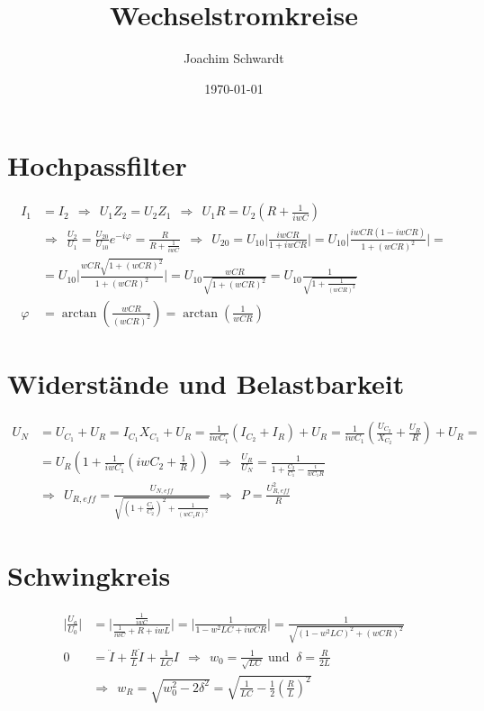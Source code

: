 \documentclass[a4paper,12pt]{article}
\begin{document}
\title{Wechselstromkreise}
\author{Joachim Schwardt}
\date{\today}
\maketitle

\section{Hochpassfilter}
\begin{align*}
I_1&=I_2\ \ \Rightarrow\ \ U_1Z_2=U_2Z_1\ \ \Rightarrow\ \ U_1R=U_2(R+\frac{1}{iwC})\\ 
&\Rightarrow\ \ \frac{U_2}{U_1}=\frac{U_{20}}{U_{10}}e^{-i\varphi}=\frac{R}{R+\frac{1}{iwC}}\ \ \Rightarrow\ \ U_{20}=U_{10}\Big\vert\frac{iwCR}{1+iwCR}\Big\vert=U_{10}\Big\vert\frac{iwCR(1-iwCR)}{1+(wCR)^2}\Big\vert=\\
&=U_{10}\Big\vert\frac{wCR\sqrt{1+(wCR)^2}}{1+(wCR)^2}\Big\vert=U_{10}\frac{wCR}{\sqrt{1+(wCR)^2}}=U_{10}\frac{1}{\sqrt{1+\frac{1}{(wCR)^2}}} \\
\varphi&=\arctan(\frac{wCR}{(wCR)^2})=\arctan(\frac{1}{wCR})
\end{align*}

\section{Widerstände und Belastbarkeit}
\begin{align*}
U_N&=U_{C_1}+U_R=I_{C_1}X_{C_1}+U_R=\frac{1}{iwC_1}(I_{C_2}+I_R)+U_R=\frac{1}{iw{C_1}}(\frac{U_{C_2}}{X_{C_2}}+\frac{U_R}{R})+U_R= \\
&=U_R(1+\frac{1}{iw{C_1}}(iw{C_2}+\frac1R))\ \ \Rightarrow\ \ \frac{U_R}{U_N}=\frac{1}{1+\frac{C_2}{C_1}-\frac{i}{w{C_1}R}}\\
&\Rightarrow\ \ U_{R,eff}=\frac{U_{N,eff}}{\sqrt{(1+\frac{C_1}{C_2})^2+\frac{1}{(w{C_1}R)^2}}}\ \ \Rightarrow\ \ P=\frac{U_{R,eff}^2}{R}
\end{align*}

\section{Schwingkreis}
\begin{align*}
\Big\vert\frac{U_a}{U_0}\Big\vert&=\Big\vert\frac{\frac{1}{iwC}}{\frac{1}{iwC}+R+iwL}\Big\vert=\Big\vert\frac{1}{1-w^2LC+iwCR}\Big\vert=\frac{1}{\sqrt{(1-w^2LC)^2+(wCR)^2}}\\
0&=\ddot{I}+\frac{R}{L}\dot{I}+\frac{1}{LC}I\ \ \Rightarrow\ \ w_0=\frac{1}{\sqrt{LC}} \textrm{ und }\ \delta = \frac{R}{2L}\\
&\Rightarrow\ \ w_R=\sqrt{w_0^2-2\delta^2}=\sqrt{\frac{1}{LC}-\frac12 (\frac{R}{L})^2}
\end{align*}
\end{document}
